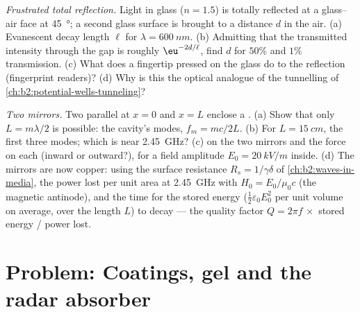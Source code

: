 \begin{exercise}[$\star\star\star$]\label{exo:b2:wave-interfaces:11}
\emph{Frustrated total reflection.} Light in glass ($n = 1.5$) is
totally reflected at a glass--air face at \qty{45}{\degree}; a second glass
surface is brought to a distance $d$ in the air. (a) Evanescent decay
length $\ell$ for $\lambda = \qty{600}{nm}$. (b) Admitting that the transmitted
intensity through the gap is roughly $\eu^{-2d/\ell}$, find $d$ for $50\%$
and $1\%$ transmission. (c) What does a fingertip pressed on the glass
do to the reflection (fingerprint readers)? (d) Why is this the
optical analogue of the tunnelling of
\cref{ch:b2:potential-wells-tunneling}?
\end{exercise}

\begin{exercise}[$\star\star\star$]\label{exo:b2:wave-interfaces:12}
\emph{Two mirrors.} Two parallel  at $x = 0$ and $x =
L$ enclose a . (a) Show that only $L = m\lambda/2$ is possible:
the cavity's modes, $f_m = mc/2L$. (b) For $L = \qty{15}{cm}$, the first
three modes; which is near \qty{2.45}{GHz}? (c)  on the
two mirrors and the force on each (inward or outward?), for a field
amplitude $E_0 = \qty{20}{kV/m}$ inside. (d) The mirrors are now copper:
using the surface resistance $R_s = 1/\gamma\delta$ of
\cref{ch:b2:waves-in-media}, the power lost per unit area at
\qty{2.45}{GHz} with $H_0 = E_0/\mu_0c$ (the magnetic antinode), and the time for the stored energy
($\tfrac12\varepsilon_0E_0^2$ per unit volume on average, over the length $L$) to
decay --- the quality factor $Q = 2\pi f\,\times$ stored energy / power lost.
\end{exercise}

\section{Problem: Coatings, gel and the radar absorber}

